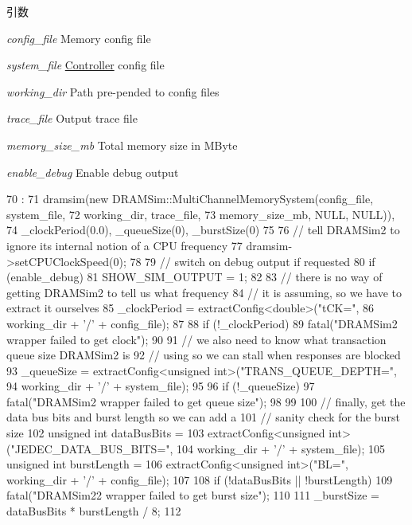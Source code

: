 \begin{DoxyParams}{引数}
\item[{\em config\_\-file}]Memory config file \item[{\em system\_\-file}]\hyperlink{namespaceController}{Controller} config file \item[{\em working\_\-dir}]Path pre-\/pended to config files \item[{\em trace\_\-file}]Output trace file \item[{\em memory\_\-size\_\-mb}]Total memory size in MByte \item[{\em enable\_\-debug}]Enable debug output \end{DoxyParams}



\begin{DoxyCode}
70                                                     :
71     dramsim(new DRAMSim::MultiChannelMemorySystem(config_file, system_file,
72                                                   working_dir, trace_file,
73                                                   memory_size_mb, NULL, NULL)),
74     _clockPeriod(0.0), _queueSize(0), _burstSize(0)
75 {
76     // tell DRAMSim2 to ignore its internal notion of a CPU frequency
77     dramsim->setCPUClockSpeed(0);
78 
79     // switch on debug output if requested
80     if (enable_debug)
81         SHOW_SIM_OUTPUT = 1;
82 
83     // there is no way of getting DRAMSim2 to tell us what frequency
84     // it is assuming, so we have to extract it ourselves
85     _clockPeriod = extractConfig<double>("tCK=",
86                                          working_dir + '/' + config_file);
87 
88     if (!_clockPeriod)
89         fatal("DRAMSim2 wrapper failed to get clock\n");
90 
91     // we also need to know what transaction queue size DRAMSim2 is
92     // using so we can stall when responses are blocked
93    _queueSize = extractConfig<unsigned int>("TRANS_QUEUE_DEPTH=",
94                                             working_dir + '/' + system_file);
95 
96     if (!_queueSize)
97         fatal("DRAMSim2 wrapper failed to get queue size\n");
98 
99 
100    // finally, get the data bus bits and burst length so we can add a
101    // sanity check for the burst size
102     unsigned int dataBusBits =
103         extractConfig<unsigned int>("JEDEC_DATA_BUS_BITS=",
104                                     working_dir + '/' + system_file);
105    unsigned int burstLength =
106        extractConfig<unsigned int>("BL=", working_dir + '/' + config_file);
107 
108    if (!dataBusBits || !burstLength)
109        fatal("DRAMSim22 wrapper failed to get burst size\n");
110 
111    _burstSize = dataBusBits * burstLength / 8;
112 }

\end{DoxyCode}
